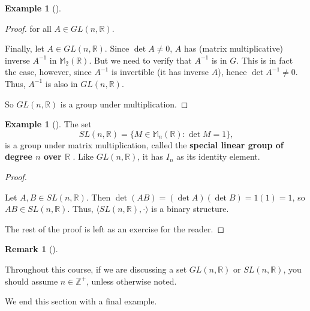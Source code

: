 \documentclass[10pt,]{book}
\newcommand{\terminology}[1]{\textbf{#1}}
\theoremstyle{plain}
\theoremstyle{definition}
\theoremstyle{definition}
\newtheorem{remark}[theorem]{Remark}
\theoremstyle{definition}
\newtheorem{example}[theorem]{Example}
\theoremstyle{definition}
\numberwithin{equation}{section}
\def\Z{\mathbb{Z}}
\def\R{\mathbb{R}}
\def\M{\mathbb{M}}
\begin{document}
\begin{example}[]
\begin{proof}
              for all \(A\in GL(n,\R)\).
\par
 Finally, let \(A\in GL(n,\R)\).  Since \(\det A\neq 0\), \(A\) has
              (matrix multiplicative) inverse \(A^{-1}\) in
              \(\M_2(\R)\). But we need to verify that \(A^{-1}\) is in
              \(G\). This is in fact the case, however, since
              \(A^{-1}\) is invertible (it has inverse \(A\)), hence \(\det
              A^{-1} \neq 0\).  Thus, \(A^{-1}\) is also in \(GL(n,\R)\).
\par

        So \(GL(n,\R)\) is a group under multiplication.
\end{proof}
\label{notation-33}
\label{notation-34}
\end{example}

%
\par

  \begin{example}[]\label{sl}
 The set
%
\begin{equation*}
SL(n,\R)=\{M\in \M_n(\R):\det M =1\}\text{,}
\end{equation*}
is a group under matrix multiplication, called the \terminology{special linear group of degree \(n\) over \(\R\) }. Like \(GL(n,\R)\), it has \(I_n\) as its identity element.%
\begin{proof}\hypertarget{proof-8}{}

  Let \(A,B\in SL(n, \R)\). Then \(\det(AB)=(\det A)(\det B) =1(1)=1\), so \(AB\in SL(n,\R)\).  Thus, 
  \(\langle SL(n,\R), \cdot\rangle\) is a binary structure.%
\par
The rest of the proof is left as an exercise for the reader.%
\end{proof}
\label{notation-35}
\end{example}

\par

\begin{remark}[]\label{remark-8}

      Throughout this course, if we are discussing a set \(GL(n,\R)\) or \(SL(n,\R)\), you should assume \(n\in \Z^+\), unless otherwise noted.
\end{remark}

%
\par
We end this section with a final example.%
\par
\end{document}
